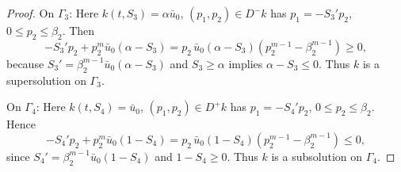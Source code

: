 \documentclass[11pt]{article}
\numberwithin{equation}{section} %
\begin{document}
\begin{proof}
On $\Gamma_3$:
Here $k(t,S_3)=\alpha\bar u_0$, $(p_1,p_2)\in D^-k$ has $p_1=-S_3'p_2$, $0\le p_2\le\beta_2$. Then
 $$
-S_3'p_2+p_2^{m}\bar u_0(\alpha-S_3)
=p_2\,\bar u_0(\alpha-S_3) (p_2^{m-1}-\beta_2^{m-1} )\ge0,
 $$
because $S_3'=\beta_2^{m-1}\bar u_0(\alpha-S_3)$ and $S_3\ge\alpha$ implies $\alpha-S_3\le0$. Thus $k$ is a supersolution on $\Gamma_3$. 

On $\Gamma_4$:
Here $k(t,S_4)=\bar u_0$, $(p_1,p_2)\in D^+k$ has $p_1=-S_4'p_2$, $0\le p_2\le\beta_2$. Hence
 $$
-S_4'p_2+p_2^{m}\bar u_0(1-S_4)
=p_2\,\bar u_0(1-S_4) (p_2^{m-1}-\beta_2^{m-1} )\le0,
 $$
since $S_4'=\beta_2^{m-1}\bar u_0(1-S_4)$ and $1-S_4\ge0$. Thus $k$ is a subsolution on $\Gamma_4$. 

\end{proof}

\printbibliography
\end{document}
